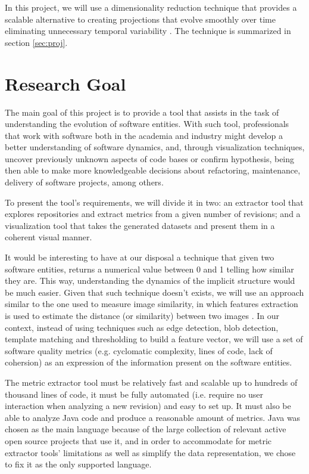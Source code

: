 In this project, we will use a dimensionality reduction technique that provides a scalable alternative to creating projections that evolve smoothly over time eliminating unnecessary temporal variability \cite{ref:dtsne}. The technique is summarized in section \ref{sec:proj}.

\section{Research Goal} \label{research_goal}
The main goal of this project is to provide a tool that assists in the task of understanding the evolution of software entities. With such tool, professionals that work with software both in the academia and industry might develop a better understanding of software dynamics, and, through visualization techniques, uncover previously unknown aspects of code bases or confirm hypothesis, being then able to make more knowledgeable decisions about refactoring, maintenance, delivery of software projects, among others.

To present the tool's requirements, we will divide it in two: an extractor tool that explores repositories and extract metrics from a given number of revisions; and a visualization tool that takes the generated datasets and present them in a coherent visual manner.

It would be interesting to have at our disposal a technique that given two software entities, returns a numerical value between 0 and 1 telling how similar they are. This way, understanding the dynamics of the implicit structure would be much easier. Given that such technique doesn't exists, we will use an approach similar to the one used to measure image similarity, in which features extraction is used to estimate the distance (or similarity) between two images  \cite{ref:imagefeatures}. In our context, instead of using techniques such as edge detection, blob detection, template matching and thresholding to build a feature vector, we will use a set of software quality metrics (e.g. cyclomatic complexity, lines of code, lack of cohersion) as an expression of the information present on the software entities.

The metric extractor tool must be relatively fast and scalable up to hundreds of thousand lines of code, it must be fully automated (i.e. require no user interaction when analyzing a new revision) and easy to set up. It must also be able to analyze Java code and produce a reasonable amount of metrics. Java was chosen as the main language because of the large collection of relevant active open source projects that use it, and in order to accommodate for metric extractor tools' limitations as well as simplify the data representation, we chose to fix it as the only supported language.

